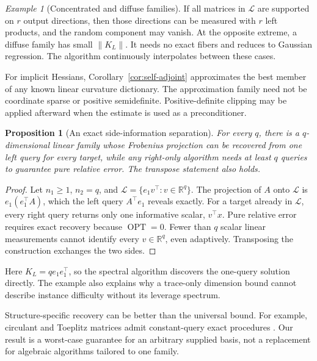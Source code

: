 \documentclass{article}
\newtheorem{proposition}[theorem]{Proposition}
\theoremstyle{remark}
\newtheorem{example}[theorem]{Example}
\newcommand{\cL}{\mathcal L}
\newcommand{\OPT}{\operatorname{OPT}}
\newcommand{\1}{\mathbf 1}
\begin{document}
\begin{example}[Concentrated and diffuse families]
If all matrices in $\cL$ are supported on $r$ output directions, then those directions can be measured with $r$ left products, and the random component may vanish.  At the opposite extreme, a diffuse family has small $\|K_L\|$.  It needs no exact fibers and reduces to Gaussian regression.  The algorithm continuously interpolates between these cases.
\end{example}

For implicit Hessians, Corollary~\ref{cor:self-adjoint} approximates the best member of any known linear curvature dictionary.  The approximation family need not be coordinate sparse or positive semidefinite.  Positive-definite clipping may be applied afterward when the estimate is used as a preconditioner.

\begin{proposition}[An exact side-information separation]
\label{prop:side-separation}
For every $q$, there is a $q$-dimensional linear family whose Frobenius projection can be recovered from one left query for every target, while any right-only algorithm needs at least $q$ queries to guarantee pure relative error.  The transpose statement also holds.
\end{proposition}

\begin{proof}
Let $n_1\ge1$, $n_2=q$, and $\cL=\{e_1v^\top:v\in\mathbb R^q\}$.  The projection of $A$ onto $\cL$ is $e_1(e_1^\top A)$, which the left query $A^\top e_1$ reveals exactly.  For a target already in $\cL$, every right query returns only one informative scalar, $v^\top x$.  Pure relative error requires exact recovery because $\OPT=0$. Fewer than $q$ scalar linear measurements cannot identify every $v\in\mathbb R^q$, even adaptively.  Transposing the construction exchanges the two sides.
\end{proof}

Here $K_L=qe_1e_1^\top$, so the spectral algorithm discovers the one-query solution directly.  The example also explains why a trace-only dimension bound cannot describe instance difficulty without its leverage spectrum.

Structure-specific recovery can be better than the universal bound.  For example, circulant and Toeplitz matrices admit constant-query exact procedures \citep{halikias2024structured,otto2023generic}.  Our result is a worst-case guarantee for an arbitrary supplied basis, not a replacement for algebraic algorithms tailored to one family.
\end{document}
